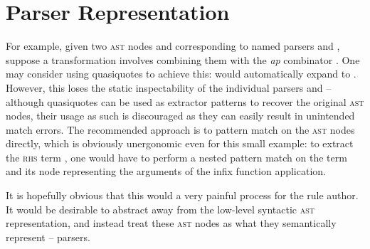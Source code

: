 \documentclass[../../main.tex]{subfiles}
\begin{document}
\section{Parser Representation}\label{sec:parser-representation}



For example, given two \textsc{ast} nodes  and  corresponding to named parsers  and , suppose a transformation involves combining them with the \emph{ap} combinator \scala{<*>}.
One may consider using quasiquotes to achieve this:  would automatically expand to .
However, this loses the static inspectability of the individual parsers  and  -- although quasiquotes can be used as extractor patterns to recover the original \textsc{ast} nodes, their usage as such is discouraged as they can easily result in unintended match errors. %
The recommended approach is to pattern match on the \textsc{ast} nodes directly, which is obviously unergonomic even for this small example: to extract the \textsc{rhs} term , one would have to perform a nested pattern match on the  term and its  node representing the arguments of the infix function application.

It is hopefully obvious that this would a very painful process for the rule author.
It would be desirable to abstract away from the low-level syntactic \textsc{ast} representation, and instead treat these \textsc{ast} nodes as what they semantically represent -- parsers.
\end{document}
